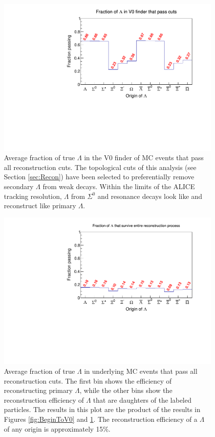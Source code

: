 \begin{figure}[hbt]
\includegraphics[width=36pc]{Figures/YieldAndEff/2016-08-10-FractionV0FinderToRecon.pdf}
\caption[Topological cut efficiency]{
Average fraction of true $\Lambda$ in the V0 finder of MC events that pass all reconstruction cuts. The topological cuts of this analysis (see Section \ref{sec:Recon}) have been selected to preferentially remove secondary $\Lambda$ from weak decays. Within the limits of the ALICE tracking resolution, $\Lambda$ from $\Sigma^0$ and resonance decays look like and reconstruct like primary $\Lambda$.
}
\label{fig:V0ToRecon}
\end{figure}

\begin{figure}[hbt]
\includegraphics[width=36pc]{Figures/YieldAndEff/2016-08-10-FractionBeginToRecon.pdf}
\caption[Total reconstruction efficiency]{
Average fraction of true $\Lambda$ in underlying MC events that pass all reconstruction cuts. The first bin shows the efficiency of reconstructing primary $\Lambda$, while the other bins show the reconstruction efficiency of $\Lambda$ that are daughters of the labeled particles. The results in this plot are the product of the results in Figures \ref{fig:BeginToV0} and \ref{fig:V0ToRecon}. The reconstruction efficiency of a $\Lambda$ of any origin is approximately 15\%.
}
\label{fig:BeginToRecon}
\end{figure}

